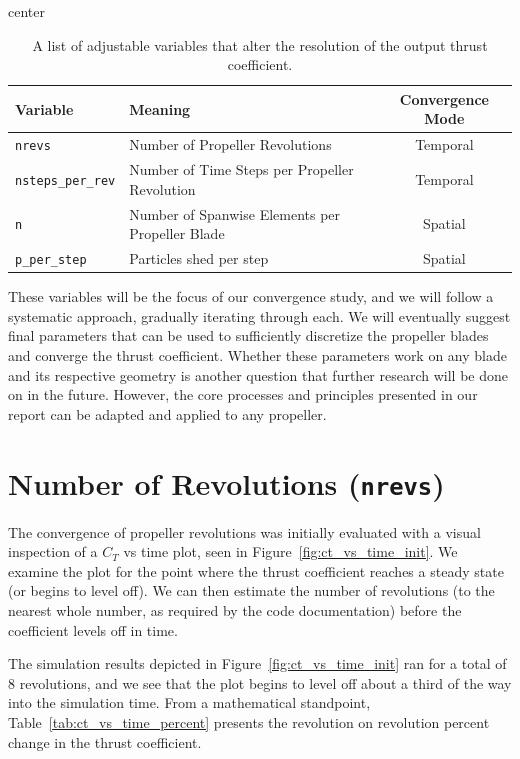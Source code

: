 \documentclass{report}
\begin{document}
\begin{table}[H]
    \centering
    \caption{A list of adjustable variables that alter the resolution of the output thrust coefficient.}\label{tab:adjustables}
    \begin{adjustbox}{center}
    \begin{tabular}{l l c}
        \toprule
        \textbf{Variable} & \textbf{Meaning} & \textbf{Convergence Mode} \\
        \midrule
        \texttt{nrevs} & Number of Propeller Revolutions & Temporal \\
        \texttt{nsteps\_per\_rev} & Number of Time Steps per Propeller Revolution & Temporal \\
        \texttt{n} & Number of Spanwise Elements per Propeller Blade & Spatial \\
        \texttt{p\_per\_step} & Particles shed per step & Spatial \\
        \bottomrule
    \end{tabular}
    \end{adjustbox}
\end{table}

These variables will be the focus of our convergence study, and we will follow a systematic approach, gradually iterating through each. We will eventually suggest final parameters that can be used to sufficiently discretize the propeller blades and converge the thrust coefficient. Whether these parameters work on any blade and its respective geometry is another question that further research will be done on in the future. However, the core processes and principles presented in our report can be adapted and applied to any propeller.

\section{Number of Revolutions (\texttt{nrevs})}
The convergence of propeller revolutions was initially evaluated with a visual inspection of a $C_T$ vs time plot, seen in Figure~\ref{fig:ct_vs_time_init}.
We examine the plot for the point where the thrust coefficient reaches a steady state (or begins to level off). We can then estimate the number of revolutions (to the nearest whole number, as required by the code documentation) before the coefficient levels off in time.

The simulation results depicted in Figure~\ref{fig:ct_vs_time_init} ran for a total of 8 revolutions, and we see that the plot begins to level off about a third of the way into the simulation time. From a mathematical standpoint, Table~\ref{tab:ct_vs_time_percent} presents the revolution on revolution percent change in the thrust coefficient.
\end{document}
